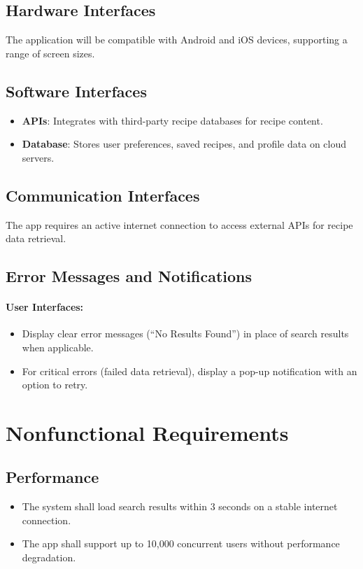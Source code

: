\documentclass[12pt]{article}
\begin{document}
\subsection{Hardware Interfaces}
The application will be compatible with Android and iOS devices, supporting a range of screen sizes.

\subsection{Software Interfaces}
\begin{itemize}
    \item \textbf{APIs}: Integrates with third-party recipe databases for recipe content.
    \item \textbf{Database}: Stores user preferences, saved recipes, and profile data on cloud servers.
\end{itemize}

\subsection{Communication Interfaces}
The app requires an active internet connection to access external APIs for recipe data retrieval.

\subsection{Error Messages and Notifications}
\paragraph{User Interfaces:}
\begin{itemize}
    \item Display clear error messages (“No Results Found”) in place of search results when applicable.
    \item For critical errors (failed data retrieval), display a pop-up notification with an option to retry.
\end{itemize}

\newpage
\section{Nonfunctional Requirements}

\subsection{Performance}
\begin{itemize}
    \item The system shall load search results within 3 seconds on a stable internet connection.
    \item The app shall support up to 10,000 concurrent users without performance degradation.
\end{itemize}
\end{document}
